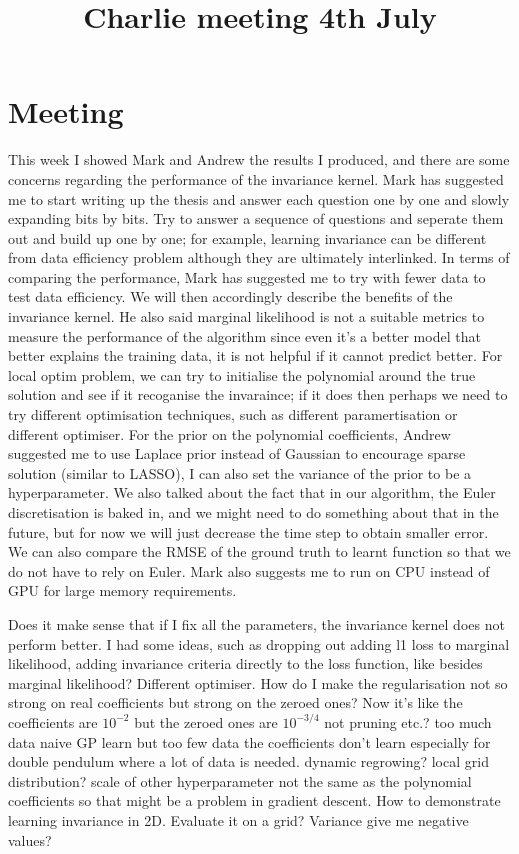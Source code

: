 \documentclass{article}
\title{\vspace{-3cm}Charlie meeting 4th July\vspace{-3em}}
\author{}
\date{}
\begin{document}
\maketitle
\section*{Meeting}
This week I showed Mark and Andrew the results I produced, and there are some concerns regarding the performance of the invariance kernel. 
Mark has suggested me to start writing up the thesis and answer each question one by one and slowly expanding bits by bits. 
Try to answer a sequence of questions and seperate them out and build up one by one; for example, learning invariance can be different from data efficiency problem although they are ultimately interlinked.  
In terms of comparing the performance, Mark has suggested me to try with fewer data to test data efficiency. 
We will then accordingly describe the benefits of the invariance kernel.
He also said marginal likelihood is not a suitable metrics to measure the performance of the algorithm since even it's a better model that better explains the training data, it is not helpful if it cannot predict better. 
For local optim problem, we can try to initialise the polynomial around the true solution and see if it recoganise the invaraince; if it does then perhaps we need to try different optimisation techniques, such as different paramertisation or different optimiser. 
For the prior on the polynomial coefficients, Andrew suggested me to use Laplace prior instead of Gaussian to encourage sparse solution (similar to LASSO), I can also set the variance of the prior to be a hyperparameter.
We also talked about the fact that in our algorithm, the Euler discretisation is baked in, and we might need to do something about that in the future, but for now we will just decrease the time step to obtain smaller error. 
We can also compare the RMSE of the ground truth to learnt function so that we do not have to rely on Euler.
Mark also suggests me to run on CPU instead of GPU for large memory requirements.

Does it make sense that if I fix all the parameters, the invariance kernel does not perform better.
I had some ideas, such as dropping out adding l1 loss to marginal likelihood, adding invariance criteria directly to the loss function, like besides marginal likelihood? Different optimiser.
How do I make the regularisation not so strong on real coefficients but strong on the zeroed ones? Now it's like the coefficients are $10^{-2}$ but the zeroed ones are $10^{-3/4}$
not pruning etc.?
too much data naive GP learn but too few data the coefficients don't learn especially for double pendulum where a lot of data is needed.
dynamic regrowing?
local grid distribution?
scale of other hyperparameter not the same as the polynomial coefficients so that might be a problem in gradient descent.
How to demonstrate learning invariance in 2D.
Evaluate it on a grid?
Variance give me negative values?
\end{document}
